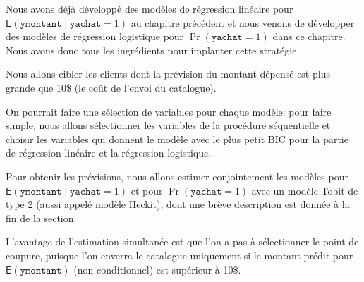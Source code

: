 \documentclass[
  11pt,
  letterpaper,
]{book}
\theoremstyle{definition}
\theoremstyle{remark}
\begin{document}
Nous avons déjà développé des modèles de régression linéaire pour
\(\mathsf{E}(\texttt{ymontant} \mid \texttt{yachat}=1)\) au chapitre
précédent et nous venons de développer des modèles de régression
logistique pour \(\Pr(\texttt{yachat}=1)\) dans ce chapitre. Nous avons
donc tous les ingrédients pour implanter cette stratégie.

Nous allons cibler les clients dont la prévision du montant dépensé est
plus grande que 10\$ (le coût de l'envoi du catalogue).

On pourrait faire une sélection de variables pour chaque modèle: pour
faire simple, nous allons sélectionner les variables de la procédure
séquentielle et choisir les variables qui donnent le modèle avec le plus
petit BIC pour la partie de régression linéaire et la régression
logistique.

Pour obtenir les prévisions, nous allons estimer conjointement les
modèles pour \(\mathsf{E}(\texttt{ymontant} \mid \texttt{yachat}=1)\) et
pour \(\Pr(\texttt{yachat}=1)\) avec un modèle Tobit de type 2 (aussi
appelé modèle Heckit), dont une brève description est donnée à la fin de
la section.

L'avantage de l'estimation simultanée est que l'on a pas à sélectionner
le point de coupure, puisque l'on enverra le catalogue uniquement si le
montant prédit pour \(\mathsf{E}(\texttt{ymontant})\) (non-conditionnel)
est supérieur à 10\$.
\end{document}
